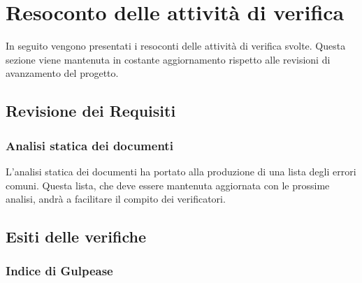 \section{Resoconto delle attività di verifica}
In seguito vengono presentati i resoconti delle attività di verifica svolte.
Questa sezione viene mantenuta in costante aggiornamento rispetto alle revisioni di avanzamento del progetto.
	\subsection{Revisione dei Requisiti}
		\subsubsection{Analisi statica dei documenti}
		L'analisi statica dei documenti ha portato alla produzione di una lista degli errori comuni. Questa lista, che deve essere mantenuta aggiornata con le prossime analisi, andrà a facilitare il compito dei verificatori.
	\subsection{Esiti delle verifiche} 
		\subsubsection{Indice di Gulpease}
